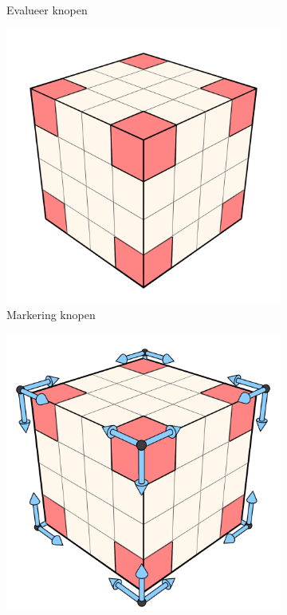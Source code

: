 \begin{figure}[p]
\begin{subfigure}[b]{.3\linewidth}
    \caption{Evalueer knopen}%
    \label{fig:hs-p1d}%
  \end{subfigure}
  \begin{subfigure}[b]{.3\linewidth}
    \includegraphics[width=\textwidth]{./img/raw/hs-slt-algorithm/hs-slt-algorithm-5.png}%
    \caption{Markering knopen}%
    \label{fig:hs-p1e}%
  \end{subfigure}
  \begin{subfigure}[b]{.3\linewidth}
    \includegraphics[width=\textwidth]{./img/raw/hs-slt-algorithm/hs-slt-algorithm-6.png}%

\end{subfigure}
\end{figure}
